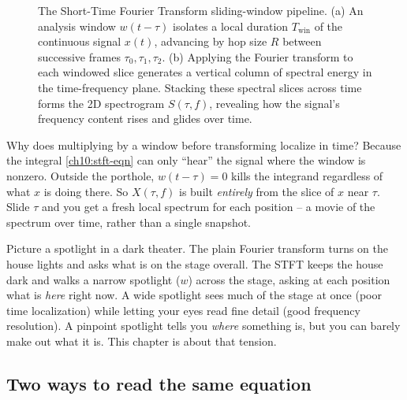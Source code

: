 \begin{figure}[H]
\caption{The Short-Time Fourier Transform sliding-window pipeline. (a) An analysis window
$w(t-\tau)$ isolates a local duration $T_{\text{win}}$ of the continuous signal $x(t)$,
advancing by hop size $R$ between successive frames $\tau_0, \tau_1, \tau_2$.
(b) Applying the Fourier transform to each windowed slice generates a vertical column
of spectral energy in the time-frequency plane. Stacking these spectral slices across
time forms the 2D spectrogram $S(\tau, f)$, revealing how the signal's frequency
content rises and glides over time.}
\label{ch10:fig-stft-sliding}
\end{figure}

\begin{whybox}
Why does multiplying by a window before transforming localize in time? Because
the integral \eqref{ch10:stft-eqn} can only ``hear'' the signal where the window
is nonzero. Outside the porthole, $w(t-\tau) = 0$ kills the integrand regardless
of what $x$ is doing there. So $X(\tau, f)$ is built \emph{entirely} from the
slice of $x$ near $\tau$. Slide $\tau$ and you get a fresh local spectrum for each
position -- a movie of the spectrum over time, rather than a single snapshot.
\end{whybox}

\begin{intuitionbox}
Picture a spotlight in a dark theater. The plain Fourier transform turns on the house
lights and asks what is on the stage overall. The STFT keeps the house dark
and walks a narrow spotlight ($w$) across the stage, asking at each position
what is \emph{here} right now. A wide spotlight sees much of the stage at
once (poor time localization) while letting your eyes read fine detail
(good frequency resolution). A pinpoint spotlight tells you \emph{where}
something is, but you can barely make out what it is. This chapter is about that
tension.
\end{intuitionbox}

\subsection{Two ways to read the same equation}

